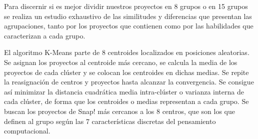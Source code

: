 \documentclass[a4paper, 12pt]{book}
\begin{document}
Para discernir si es mejor dividir nuestros proyectos en 8 grupos o en 15 grupos se realiza un estudio exhaustivo de las similitudes y diferencias que presentan las agrupaciones, tanto por los proyectos que contienen como por las habilidades que caracterizan a cada grupo.

El algoritmo K-Means parte de 8 centroides localizados en posiciones aleatorias. Se asignan los proyectos al centroide más cercano, se calcula la media de los proyectos de cada clúster y se colocan los centroides en dichas medias. Se repite la reasignación de centros y proyectos hasta alcanzar la convergencia. Se consigue así minimizar la distancia cuadrática media intra-clúster o varianza interna de cada clúster, de forma que los centroides o medias representan a cada grupo. Se buscan los proyectos de Snap! más cercanos a los 8 centros, que son los que definen al grupo según las 7 características discretas del pensamiento computacional.

\begin{table}[H]
    \centering
    \caption{Puntuaciones de los proyectos representativos para el clustering con k=8}
    \label{table:representative_k8}
\end{table}
\end{document}
